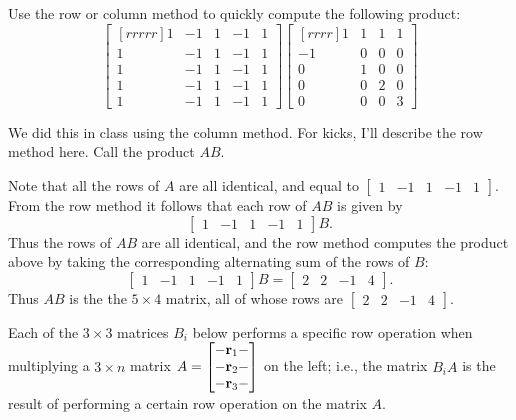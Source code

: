 \bb
\ii Use the row or column method to quickly compute the following product:
\[
\begin{bmatrix}[rrrrr]
1&-1&1&-1&1\\
1&-1&1&-1&1\\
1&-1&1&-1&1\\
1&-1&1&-1&1\\
1&-1&1&-1&1
\end{bmatrix}
\begin{bmatrix}[rrrr]
1&1&1&1\\
-1&0&0&0\\
0&1&0&0\\
0&0&2&0\\
0&0&0&3
\end{bmatrix}
\]
\begin{solution}
We did this in class using the column method. For kicks, I'll describe the row method here. Call the product $AB$. 

Note that all the rows of $A$ are all identical, and equal to $\begin{bmatrix} 1 &-1 &1 &-1 &1\end{bmatrix}$. From the row method it follows that each row of $AB$ is given by 
\[
\begin{bmatrix} 1 &-1 &1 &-1 &1\end{bmatrix}B.
\]
Thus the rows of $AB$ are all identical, and the row method computes the product above by taking the corresponding alternating sum of the rows of $B$: 
\[
\begin{bmatrix} 1 &-1 &1 &-1 &1\end{bmatrix}B=\begin{bmatrix}
2&2&-1&4
\end{bmatrix}.
\]
Thus $AB$ is the the $5\times 4 $ matrix, all of whose rows are $\begin{bmatrix}
2&2&-1&4
\end{bmatrix}$.


\end{solution}
\ii Each of the $3\times 3 $ matrices $B_i$ below performs a specific row operation when multiplying a $3\times n$ matrix $A=\begin{bmatrix}
-{\mathbf r}_1-\\
-{\mathbf r}_2-\\
-{\mathbf r}_3-
\end{bmatrix}$ on the left; i.e., the matrix $B_iA$ is the result of performing a certain row operation on the matrix $A$. 

